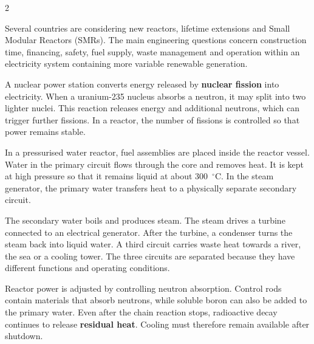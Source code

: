 

\begin{multicols}{2}

\begin{engineeringnews}
Several countries are considering new reactors, lifetime extensions and Small Modular Reactors (SMRs). The main engineering questions concern construction time, financing, safety, fuel supply, waste management and operation within an electricity system containing more variable renewable generation.
\end{engineeringnews}

\begin{ecarticle}
A nuclear power station converts energy released by \textbf{nuclear fission} into electricity. When a uranium-235 nucleus absorbs a neutron, it may split into two lighter nuclei. This reaction releases energy and additional neutrons, which can trigger further fissions. In a reactor, the number of fissions is controlled so that power remains stable.

In a pressurised water reactor, fuel assemblies are placed inside the reactor vessel. Water in the primary circuit flows through the core and removes heat. It is kept at high pressure so that it remains liquid at about 300~$^{\circ}$C. In the steam generator, the primary water transfers heat to a physically separate secondary circuit.

The secondary water boils and produces steam. The steam drives a turbine connected to an electrical generator. After the turbine, a condenser turns the steam back into liquid water. A third circuit carries waste heat towards a river, the sea or a cooling tower. The three circuits are separated because they have different functions and operating conditions.

Reactor power is adjusted by controlling neutron absorption. Control rods contain materials that absorb neutrons, while soluble boron can also be added to the primary water. Even after the chain reaction stops, radioactive decay continues to release \textbf{residual heat}. Cooling must therefore remain available after shutdown.


\end{ecarticle}
\end{multicols}
